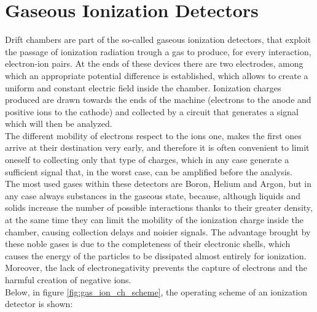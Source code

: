 \documentclass[a4paper,11pt]{book}
\begin{document}
\section{Gaseous Ionization Detectors}
Drift chambers are part of the so-called gaseous ionization detectors, that exploit the passage of ionization radiation trough a gas to produce, for every interaction, electron-ion pairs. At the ends of these devices there are two electrodes, among which an appropriate potential difference is established, which allows to create a uniform and constant electric field inside the chamber. Ionization charges produced are drawn towards the ends of the machine (electrons to the anode and positive ions to the cathode) and collected by a circuit that generates a signal which will then be analyzed.\\
The different mobility of electrons respect to the ions one, makes the first ones arrive at their destination very early, and therefore it is often convenient to limit oneself to collecting only that type of charges, which in any case generate a sufficient signal that, in the worst case, can be amplified before the analysis.\\
The most used gases within these detectors are Boron, Helium and Argon, but in any case always substances in the gaseous state, because, although liquids and solids increase the number of possible interactions thanks to their greater density, at the same time they can limit the mobility of the ionization charge inside the chamber, causing collection delays and noisier signals. The advantage brought by these noble gases is due to the completeness of their electronic shells, which causes the energy of the particles to be dissipated almost entirely for ionization. Moreover, the lack of electronegativity prevents the capture of electrons and the harmful creation of negative ions.\\
Below, in figure \ref{fig:gas_ion_ch_scheme}, the operating scheme of an ionization detector is shown:\\
\end{document}
